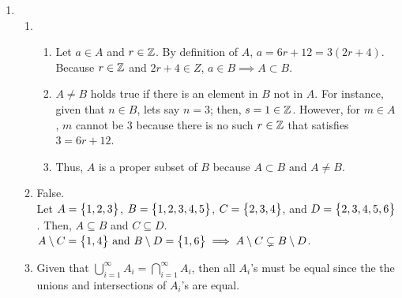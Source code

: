 \begin{enumerate}
    \item
          \begin{enumerate}[label=(\alph*), itemsep=10pt]
              \item
                    \begin{enumerate}
                        \item
                              Let $a \in A$ and $r \in \operatorname{\mathbb{Z}}$. By definition of $A$, $a = 6r + 12 = 3(2r + 4)$. Because $r \in \operatorname{\mathbb{Z}}$ and $2r + 4 \in Z$, $a \in B \implies A \subset B$.
                        \item
                              $A \neq B$ holds true if there is an element in $B$ not in $A$. For instance, given that $n \in B$, lets say $n = 3$; then, $s = 1 \in \operatorname{\mathbb{Z}}$. However, for $m \in A$, $m$ cannot be 3 because there is no such $r \in \operatorname{\mathbb{Z}}$ that satisfies $3 = 6r + 12$.
                        \item
                              Thus, $A$ is a proper subset of $B$ because $A \subset B \text{ and } A \neq B$.
                    \end{enumerate}
              \item False. \\
                    Let $A = \bigl\{ {1,2,3} \bigr\}$, $B = \bigl\{ {1,2,3,4,5} \bigr\}$, $C = \bigl\{ {2,3,4} \bigr\}$, and $D = \bigl\{ {2,3,4,5,6} \bigr\}$. Then, $A \subseteq B$ and $C \subseteq D$. $A \setminus C = \bigl\{ {1,4} \bigr\} \text{ and } B \setminus D = \bigl\{ {1,6} \bigr\} \implies A \setminus C \subsetneq B \setminus D$.

              \item
                    Given that $\bigcup_{i=1}^{\infty} A_i= \bigcap_{i=1}^{\infty} A_i$, then all $A_i$'s must be equal since the the unions and intersections of $A_i$'s are equal.
          \end{enumerate}
\end{enumerate}